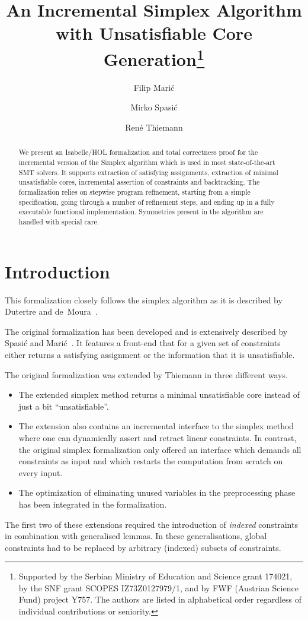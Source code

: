 \documentclass[11pt,a4paper]{article}
\begin{document}
\title{An Incremental Simplex Algorithm with Unsatisfiable Core Generation\footnote{%
Supported by the Serbian Ministry of Education and Science grant 174021, 
by the SNF grant SCOPES IZ73Z0127979/1, and
by FWF (Austrian Science Fund) project Y757.
The authors are listed in alphabetical order regardless of individual
contributions or seniority.}}
\author{Filip Mari\'c \and Mirko Spasi\'c \and Ren\'e Thiemann}

\maketitle

\begin{abstract}
We present an Isabelle/HOL formalization and total correctness
proof for the incremental version of the Simplex algorithm which is
used in most state-of-the-art SMT solvers. It supports extraction of satisfying
assignments, extraction of minimal unsatisfiable cores, incremental assertion of constraints
and backtracking. The formalization relies on
stepwise program refinement, starting from a simple specification,
going through a number of refinement steps, and ending up in a fully
executable functional implementation. Symmetries present in the algorithm
are handled with special care. 
\end{abstract}


\tableofcontents

\section{Introduction}

This formalization closely follows the simplex algorithm as it is described by 
Dutertre and de~Moura~\cite{simplex-rad}. 

The original formalization has been developed and is extensively described 
by Spasi\'c and Mari\'c~\cite{SpasicMaric}.
It features a front-end that for a given set of constraints either returns
a satisfying assignment or the information that it is unsatisfiable.

The original formalization was extended by Thiemann in three different ways.
\begin{itemize}
\item The extended simplex method returns a minimal unsatisfiable core instead
  of just a bit ``unsatisfiable''.
\item The extension also contains an incremental interface to the simplex
  method where one can dynamically assert and retract linear constraints.
  In contrast, the original simplex formalization only offered an 
  interface which demands all constraints as input and which restarts
  the computation from scratch on every input.
\item The optimization of eliminating unused variables in the preprocessing 
  phase~\cite[Section~3]{simplex-rad} has been integrated in the formalization.
\end{itemize}
The first two of these extensions
required the introduction of \emph{indexed} constraints in combination with
generalised lemmas. In these generalisations, global constraints had to be replaced by arbitrary (indexed) subsets of constraints. 










\end{document}
